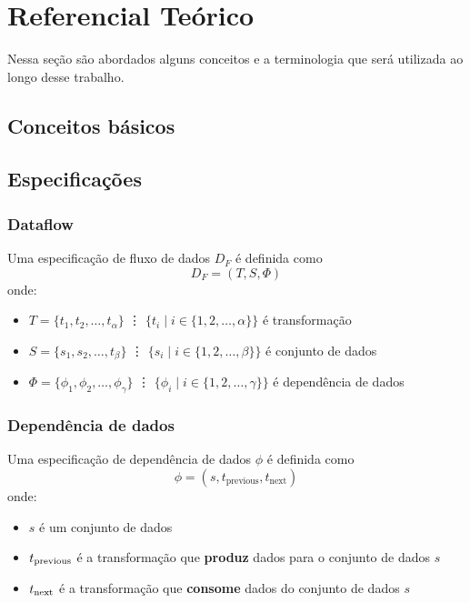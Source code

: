 
\chapter{Referencial Teórico}%
\label{chap:referencial-teorico}


Nessa seção são abordados alguns conceitos e a terminologia que será utilizada ao longo desse trabalho.

\section{Conceitos básicos}

\section{Especificações}

\subsection{Dataflow}

Uma especificação de fluxo de dados \( D_F \) é definida como \[ D_F = (T, S, \Phi) \] onde:
\begin{itemize}
    \item \( T = \{t_1, t_2, \ldots, t_{\alpha}\} \) \vdots{}
    \( \{t_i \mid i \in \{{1, 2, \ldots, \alpha}\} \} \)
    é transformação
    \item \( S = \{s_1, s_2, \ldots, t_{\beta}\} \) \vdots{}
    \( \{s_i \mid i \in \{{1, 2, \ldots, \beta}\} \} \)
    é conjunto de dados
    \item \( \Phi = \{\phi_1, \phi_2, \ldots, \phi_{\gamma}\} \) \vdots{}
    \( \{\phi_i \mid i \in \{{1, 2, \ldots, \gamma}\} \} \){}
    é dependência de dados
\end{itemize}

\subsection{Dependência de dados}

Uma especificação de dependência de dados \( \phi \) é definida como \[ \phi = (s, t_{\textrm{previous}}, t_{\textrm{next}}) \] onde:
\begin{itemize}
    \item \( s \) é um conjunto de dados
    \item \( t_{\textup{previous}} \) é a transformação que {\bf produz} dados para o conjunto de dados \( s \)
    \item \( t_{\textup{next}} \) é a transformação que {\bf consome} dados do conjunto de dados \( s \)
\end{itemize}

